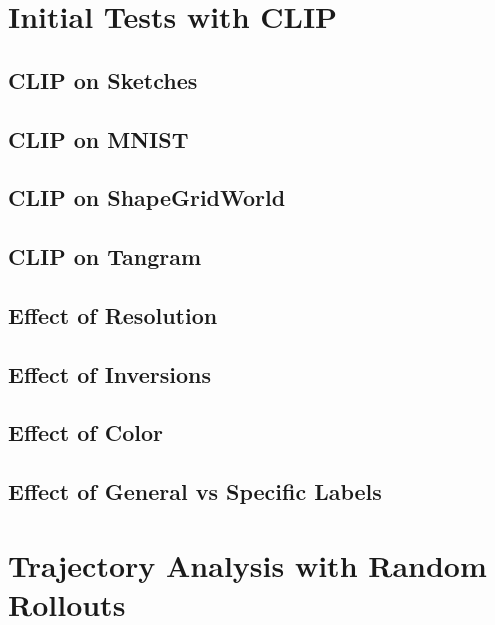\section{Initial Tests with CLIP}
\label{sec:clip-custom}


\subsection{CLIP on Sketches}
\label{sec:clip-sketches}


\subsection{CLIP on MNIST}
\label{sec:clip-mnist}


\subsection{CLIP on ShapeGridWorld}
\label{sec:clip-sgw}


\subsection{CLIP on Tangram}
\label{sec:clip-tangram}


\subsection{Effect of Resolution}
\label{sec:clip-resolution}


\subsection{Effect of Inversions}
\label{sec:clip-inversions}


\subsection{Effect of Color}
\label{sec:clip-color}


\subsection{Effect of General vs Specific Labels}
\label{sec:clip-labels}


\section{Trajectory Analysis with Random Rollouts}
\label{sec:random-rollouts}


